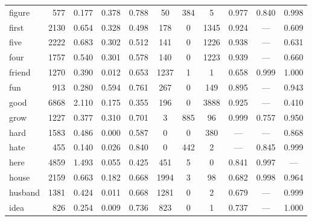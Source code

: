 \begin{landscape}
\begin{longtable}[c]{ l | r r c c | c c c | c c c }
  figure     & 577   & 0.177                   & 0.378           & 0.788      & 50        & 384         & 5            & 0.977     & 0.840       & 0.998\\
  first      & 2130  & 0.654                   & 0.328           & 0.498      & 178       & 0           & 1345         & 0.924     & —           & 0.609\\
  five       & 2222  & 0.683                   & 0.302           & 0.512      & 141       & 0           & 1226         & 0.938     & —           & 0.631\\
  four       & 1757  & 0.540                   & 0.301           & 0.578      & 140       & 0           & 1223         & 0.939     & —           & 0.660\\
  friend     & 1270  & 0.390                   & 0.012           & 0.653      & 1237      & 1           & 1            & 0.658     & 0.999       & 1.000\\
  fun        & 913   & 0.280                   & 0.594           & 0.761      & 267       & 0           & 149          & 0.895     & —           & 0.943\\
  good       & 6868  & 2.110                   & 0.175           & 0.355      & 196       & 0           & 3888         & 0.925     & —           & 0.410\\
  grow       & 1227  & 0.377                   & 0.310           & 0.701      & 3         & 885         & 96           & 0.999     & 0.757       & 0.950\\
  hard       & 1583  & 0.486                   & 0.000           & 0.587      & 0         & 0           & 380          & —         & —           & 0.868\\
  hate       & 455   & 0.140                   & 0.026           & 0.840      & 0         & 442         & 2            & —         & 0.845       & 0.999\\
  here       & 4859  & 1.493                   & 0.055           & 0.425      & 451       & 5           & 0            & 0.841     & 0.997       & —\\
  house      & 2159  & 0.663                   & 0.182           & 0.668      & 1994      & 3           & 98           & 0.682     & 0.998       & 0.964\\
  husband    & 1381  & 0.424                   & 0.011           & 0.668      & 1281      & 0           & 2            & 0.679     & —           & 0.999\\
  idea       & 826   & 0.254                   & 0.009           & 0.736      & 823       & 0           & 1            & 0.737     & —           & 1.000\\

\end{longtable}
\end{landscape}
